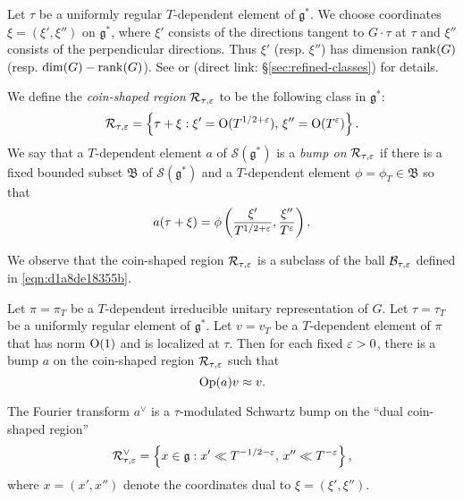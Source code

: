 \documentclass[reqno]{amsart} 
\numberwithin{equation}{section}
\numberwithin{theorem}{section}
\begin{document}
\begin{definition}
  Let $\tau$ be a uniformly regular $T$-dependent element of $\mathfrak{g}^*$.  We choose coordinates $\xi = (\xi ', \xi '')$ on $\mathfrak{g}^*$, where $\xi '$ consists of the directions tangent to $G \cdot \tau$ at $\tau$ and $\xi ''$ consists of the perpendicular directions.  Thus $\xi'$ (resp. $\xi ''$) has dimension $\operatorname{rank}(G)$ (resp. $\dim(G) - \operatorname{rank}(G)$).  See \cite[\S9.4.1]{2020arXiv201202187N} or \cite[\S13.3.4]{2021arXiv210915230N} (direct link: \S\ref{sec:refined-classes}) for details.

  We define the \emph{coin-shaped region} $\mathcal{R} _{\tau,\varepsilon}$ to be the following class in $\mathfrak{g}^*$:
  \begin{equation*}
\mathcal{R}_{\tau,\varepsilon} = \left\{ \tau + \xi : \xi ' = \operatorname{O}(T^{1/2+\varepsilon}), \, \xi '' = \operatorname{O}(T^{\varepsilon}) \right\}.
\end{equation*}
We say that a $T$-dependent element $a$ of $\mathcal{S}(\mathfrak{g}^*)$ is a \emph{bump on} $\mathcal{R}_{\tau,\varepsilon}$ if there is a fixed bounded subset $\mathfrak{B}$ of $\mathcal{S}(\mathfrak{g}^*)$ and a $T$-dependent element $\phi = \phi_T \in \mathfrak{B}$ so that
\begin{equation*}
a(\tau + \xi ) = \phi\left(\frac{\xi ' }{ T^{1/2+\varepsilon}}, \frac{\xi '' }{ T^\varepsilon}\right).
\end{equation*}
\end{definition}
We observe that the coin-shaped region $\mathcal{R}_{\tau,\varepsilon}$ is a subclass of the ball $\mathcal{B}_{\tau,\varepsilon}$ defined in \eqref{eqn:d1a8de18355b}.

\begin{theorem}
  Let $\pi = \pi_T$ be a $T$-dependent irreducible unitary representation of $G$.  Let $\tau = \tau_T$ be a uniformly regular element of $\mathfrak{g}^*$.  Let $v = v_T$ be a $T$-dependent element of $\pi$ that has norm $\operatorname{O}(1)$ and is localized at $\tau$.  Then for each fixed $\varepsilon > 0$, there is a bump $a$ on the coin-shaped region $\mathcal{R}_{\tau,\varepsilon}$ such that
  \begin{equation*}
    \operatorname{Op}(a) v \approx v.
  \end{equation*}
\end{theorem}

\begin{remark}
  The Fourier transform $a^\vee$ is a $\tau$-modulated Schwartz bump on the ``dual coin-shaped region''
  \begin{equation*}
    \mathcal{R}_{\tau,\varepsilon}^\vee = \left\{ x \in \mathfrak{g} : x ' \ll T^{-1/2-\varepsilon}, \, x '' \ll T^{-\varepsilon} \right\},
  \end{equation*}
  where $x = (x', x'')$ denote the coordinates dual to $\xi = (\xi ', \xi '')$.
\end{remark}
\end{document}

